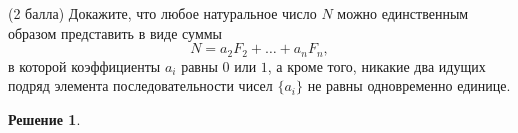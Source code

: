 \documentclass[12pt,fleqn,a4paper]{article}
\newtheorem*{solution}{Решение}
\newenvironment{task}[2] {
	\noindent\fbox{\bf {#1} {#2}.}
}{
}
\begin{document}
	\begin{task}{DM}{58}
		(2 балла) Докажите, что любое натуральное число $N$ можно единственным образом представить в виде суммы $$ N=a_2F_2+\ldots+a_nF_n,$$
		в которой коэффициенты $a_i$ равны $0$ или $1$, а кроме того, никакие два идущих подряд элемента последовательности чисел $\{a_i\}$ не равны одновременно единице.
	\end{task}
	\begin{solution}
	\end{solution}
\end{document}
